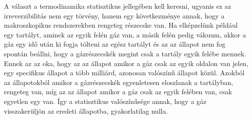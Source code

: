 \documentclass[../main.tex]{subfiles}
\begin{document}
A választ a termodinamika statisztikus jellegében kell keresni, ugyanis ez az irreverzibilitás nem egy törvény, hanem egy következménye annak, hogy a makroszkopikus rendszerekben rengeteg részecske van.
Ha elképzelünk például egy tartályt, aminek az egyik felén gáz van, a másik felén pedig vákuum, akkor a gáz egy idő után ki fogja tölteni az egész tartályt és az az állapot nem fog spontán beállni, hogy a gázrészecskék megint csak a tartály egyik felébe mennek.
Ennek az az oka, hogy az az állapot amikor a gáz csak az egyik oldalon van jelen, egy specifikus állapot a több milliárd, azonosan valószínű állapot közül. Azokból az állapotokból amikor a gázrészecskék egyenletesen eloszlanak a tartályban,
rengeteg van, míg az az állapot amikor a gáz csak az egyik felében van, csak egyetlen egy van. Így a statisztikus valószínűsége annak, hogy a gáz visszakerüljön az eredeti állapotba, gyakorlatilag nulla.
\end{document}
